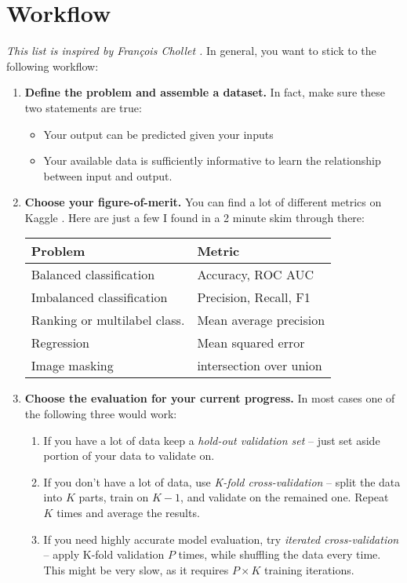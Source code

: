 \section{Workflow}
\label{sec:workflow}
{\em This list is inspired by Fran\c{c}ois Chollet \cite{Chollet:2017:DLP:3203489}.}
In general, you want to stick to the following workflow:
\begin{enumerate}

\item {\bf Define the problem and assemble a dataset.}
In fact, make sure these two statements are true:
 \begin{itemize}
 \item Your output can be predicted given your inputs
 \item Your available data is sufficiently informative to learn the  relationship between input and output.
 \end{itemize}

\item {\bf Choose your figure-of-merit.}
You can find a lot of different metrics on Kaggle \cite{kaggle}.
Here are just a few I found in a 2 minute skim through there:
\begin{center}
\begin{tabular}{ l l}
 Problem & Metric \\
 \hline
 Balanced classification & Accuracy, ROC AUC \\
 Imbalanced classification & Precision, Recall, F1 \\
 Ranking or multilabel class. & Mean average precision \\
 Regression & Mean squared error \\
 Image masking & intersection over union
\end{tabular}
\end{center}

\item {\bf Choose the evaluation for your current progress.}
In most cases one of the following three would work:
 \begin{enumerate}
 \item If you have a lot of data keep a {\em hold-out validation set} -- just set aside portion of your data to validate on.
 \item If you don't have a lot of data, use {\em K-fold cross-validation} -- split the data into $K$ parts, train on $K-1$, and validate on the remained one.
 Repeat $K$ times and average the results.
 \item If you need highly accurate model evaluation, try {\em iterated cross-validation} -- apply K-fold validation $P$ times, while shuffling the data every time.
 This might be very slow, as it requires $P\times K$ training iterations.
 \end{enumerate}


\end{enumerate}
